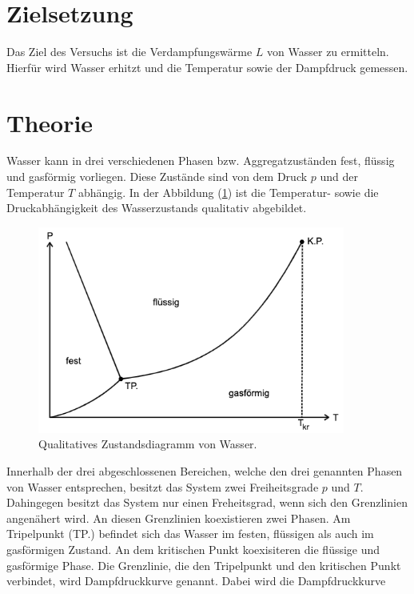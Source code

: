 \section{Zielsetzung}
\label{sec:Zielsetzung}
\nocite{anleitungV203}
Das Ziel des Versuchs ist die Verdampfungswärme $L$ von Wasser zu ermitteln. Hierfür wird Wasser erhitzt und
die Temperatur sowie der Dampfdruck gemessen.

\section{Theorie}
\label{sec:Theorie}
Wasser kann in drei verschiedenen Phasen bzw. Aggregatzuständen fest, flüssig und gasförmig vorliegen.
Diese Zustände sind von dem Druck $p$ und der Temperatur $T$ abhängig. In der Abbildung (\ref{fig:ZustandsdiagrammWasser})
ist die Temperatur- sowie die Druckabhängigkeit des Wasserzustands qualitativ abgebildet.
\begin{figure}[H]
    \centering
    \includegraphics[width=0.90\textwidth]{ZustandsdiagrammWasser.png}
    \caption{Qualitatives Zustandsdiagramm von Wasser. \cite{anleitungV203}}
    \label{fig:ZustandsdiagrammWasser}
\end{figure}
Innerhalb der drei abgeschlossenen Bereichen, welche den drei genannten Phasen von Wasser entsprechen, besitzt das System 
zwei Freiheitsgrade $p$ und $T$. Dahingegen besitzt das System nur einen Freheitsgrad, wenn sich den Grenzlinien angenähert wird. An diesen
Grenzlinien koexistieren zwei Phasen. Am Tripelpunkt (TP.) befindet sich das Wasser im festen, flüssigen als auch im gasförmigen Zustand.
An dem kritischen Punkt koexisiteren die flüssige und gasförmige Phase. 
Die Grenzlinie, die den Tripelpunkt und den kritischen Punkt verbindet, wird Dampfdruckkurve genannt. Dabei wird die Dampfdruckkurve
